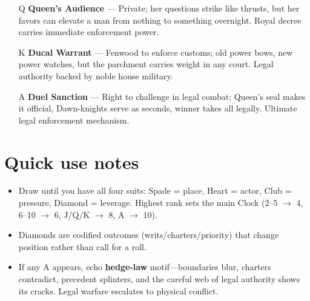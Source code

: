 \begin{enumerate}
\item[Q] \textbf{Queen's Audience} --- Private; her questions strike like thrusts, but her favors can elevate a man from nothing to something overnight. Royal decree carries immediate enforcement power.
\item[K] \textbf{Ducal Warrant} --- Fenwood to enforce customs; old power bows, new power watches, but the parchment carries weight in any court. Legal authority backed by noble house military.
\item[A] \textbf{Duel Sanction} --- Right to challenge in legal combat; Queen's seal makes it official, Dawn-knights serve as seconds, winner takes all legally. Ultimate legal enforcement mechanism.
\end{enumerate}

\section*{Quick use notes}
\label{sec:viterra-quick-use}
\begin{itemize}
\item Draw until you have all four suits: Spade = place, Heart = actor, Club = pressure, Diamond = leverage. Highest rank sets the main Clock (2--5 $\rightarrow$ 4, 6--10 $\rightarrow$ 6, J/Q/K $\rightarrow$ 8, A $\rightarrow$ 10).
\item Diamonds are codified outcomes (writs/charters/priority) that change position rather than call for a roll.
\item If any A appears, echo \textbf{hedge-law} motif—boundaries blur, charters contradict, precedent splinters, and the careful web of legal authority shows its cracks. Legal warfare escalates to physical conflict.
\end{itemize}

